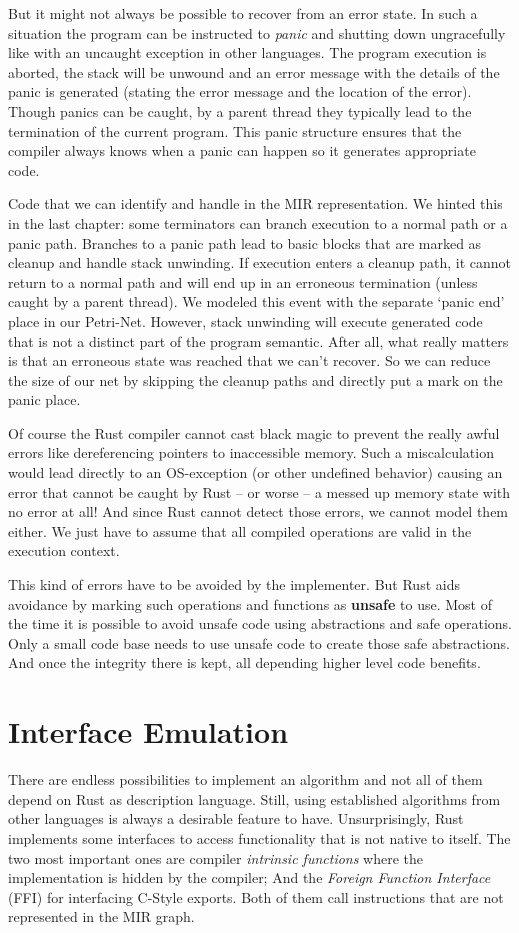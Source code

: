 But it might not always be possible to recover from an error state.
In such a situation the program can be instructed to \textit{panic} and shutting down ungracefully like with an uncaught exception in other languages.
The program execution is aborted, the stack will be unwound and an error message with the details of the panic is generated (stating the error message and the location of the error).
Though panics can be caught, by a parent thread they typically lead to the termination of the current program.
This panic structure ensures that the compiler always knows when a panic can happen so it generates appropriate code.

Code that we can identify and handle in the MIR representation.
We hinted this in the last chapter: some terminators can branch execution to a normal path or a panic path.
Branches to a panic path lead to basic blocks that are marked as cleanup and handle stack unwinding.
If execution enters a cleanup path, it cannot return to a normal path and will end up in an erroneous termination (unless caught by a parent thread).
We modeled this event with the separate `panic end' place in our Petri-Net.
However, stack unwinding will execute generated code that is not a distinct part of the program semantic.
After all, what really matters is that an erroneous state was reached that we can't recover.
So we can reduce the size of our net by skipping the cleanup paths and directly put a mark on the panic place.

Of course the Rust compiler cannot cast black magic to prevent the really awful errors like dereferencing pointers to inaccessible memory.
Such a miscalculation would lead directly to an OS-exception (or other undefined behavior) causing an error that cannot be caught by Rust -- or worse -- a messed up memory state with no error at all!
And since Rust cannot detect those errors, we cannot model them either.
We just have to assume that all compiled operations are valid in the execution context.

This kind of errors have to be avoided by the implementer.
But Rust aids avoidance by marking such operations and functions as \textbf{unsafe} to use.
Most of the time it is possible to avoid unsafe code using abstractions and safe operations.
Only a small code base needs to use unsafe code to create those safe abstractions. 
And once the integrity there is kept, all depending higher level code benefits.

\section{Interface Emulation}
\label{emulation}
There are endless possibilities to implement an algorithm and not all of them depend on Rust as description language.
Still, using established algorithms from other languages is always a desirable feature to have.
Unsurprisingly, Rust implements some interfaces to access functionality that is not native to itself.
The two most important ones are compiler \textit{intrinsic functions} where the implementation is hidden by the compiler;
And the \textit{Foreign Function Interface} (FFI) for interfacing C-Style exports.
Both of them call instructions that are not represented in the MIR graph.

